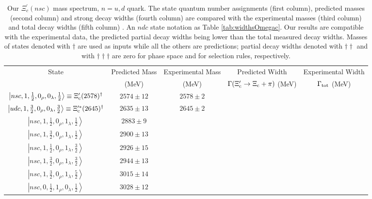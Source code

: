 \documentclass[twocolumn,superscriptaddress,preprintnumbers,nofootinbib]{revtex4}
\begin{document}
\begin{table*}[htbp]
\caption{Our $\Xi^\prime_c (nsc)$ mass spectrum, $n=u,d$ quark. The  state quantum number assignments (first column), predicted masses (second column) and strong decay widths (fourth column) are compared with the  experimental  masses (third column) and total decay widths (fifth column) \cite{Aaij:2017nav,Tanabashi:2018oca}. An $ndc$ state notation as Table \ref{tab:widthsOmegac}. Our results are compatible with the experimental data, the predicted partial decay widths being lower than the total measured decay widths. Masses of states denoted  with $\dagger$ are used as inputs while all the others
are predictions; partial decay widths denoted with $\dagger  \dagger  $ and with  $\dagger  \dagger  \dagger $  are zero for phase space and for selection rules, respectively. }
\begin{tabular}{ccccc}
\hline
\hline
State & Predicted Mass & Experimental Mass & Predicted Width & Experimental Width\\
         & (MeV)                & (MeV)                      & $\Gamma(\Xi^{\prime}_{\rm c}
 \rightarrow \Xi_{\rm c}+\pi)$ (MeV) &  $\Gamma_{\rm tot}$  (MeV) \\
\hline
$\left| nsc,1, \frac{1}{2},0_{\rho},0_{\lambda}, \frac{1}{2} \right\rangle \equiv \Xi^{\prime}_{\rm c}(2578)^{\dagger}$   &  $2574 \pm 12$ & $2578\pm2$ &   &   \\
$\left| udc,1, \frac{3}{2},0_{\rho},0_{\lambda}, \frac{3}{2} \right\rangle \equiv \Xi^{\prime *}_{\rm c}(2645)^{\dagger}$   & $2635\pm13$ &   $2645\pm2$ &  &  \\
$\left| nsc,1, \frac{1}{2},0_{\rho},1_{\lambda}, \frac{1}{2} \right\rangle $   &  $ 2883\pm 9$ &  &  &  \\
$\left| nsc,1, \frac{3}{2},0_{\rho},1_{\lambda},  \frac{1}{2} \right\rangle $   &  $ 2900\pm 13$   & &   & \\
$\left| nsc,1,  \frac{1}{2},0_{\rho},1_{\lambda}, \frac{3}{2} \right\rangle $  &  $2926 \pm 15$ &  &    &  \\
$\left| nsc,1, \frac{3}{2},0_{\rho},1_{\lambda}, \frac{3}{2} \right\rangle  $  & $2944\pm13$ &  &  &  \\
$\left| nsc,1, \frac{3}{2},0_{\rho},1_{\lambda}, \frac{5}{2} \right\rangle $  & $ 3015\pm14$ &  & &   \\
 $\left| nsc,0, \frac{1}{2},1_{\rho},0_{\lambda}, \frac{1}{2} \right\rangle  $ &  $3028 \pm 12$ &  &  &  \\

\end{tabular}
\end{table*}
\end{document}
